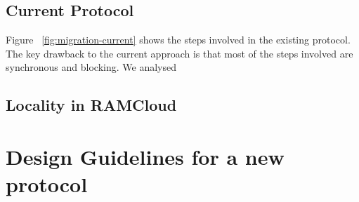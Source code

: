 \subsection{Current Protocol}

Figure ~\ref{fig:migration-current} shows the steps involved in the existing protocol. The key drawback to the current approach is that 
most of the steps involved are synchronous and blocking. We analysed 

\subsection{Locality in RAMCloud}


\section{Design Guidelines for a new protocol}

